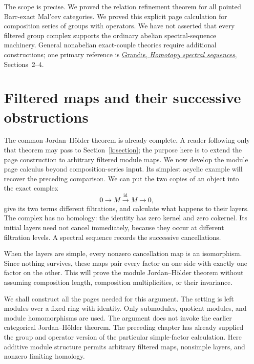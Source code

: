 \documentclass[11pt]{article}
\theoremstyle{definition}
\theoremstyle{remark}\newtheorem{remark}[theorem]{Remark}
\newcommand{\id}{\mathrm{id}}
\begin{document}
The scope is precise. We proved the relation refinement theorem for all
pointed Barr-exact Mal'cev categories. We proved this explicit page
calculation for composition series of groups with operators. We have not
asserted that every filtered group complex supports the ordinary abelian
spectral-sequence machinery. General nonabelian exact-couple theories
require additional constructions; one primary reference is
\href{https://arxiv.org/pdf/1007.0632}{Grandis, \emph{Homotopy spectral
sequences}}, Sections~2--4.



\section{Filtered maps and their successive obstructions}\label{s:chapter}

The common Jordan--H\"older theorem is already complete. A reader following
only that theorem may pass to Section~\ref{k:section}; the purpose here
is to extend the page construction to arbitrary filtered module maps.
We now develop the module page calculus beyond composition-series input.
Its simplest acyclic example will recover the preceding comparison.
We can put the two copies of an object into the exact complex
\[
0\longrightarrow M\xrightarrow{\id}M\longrightarrow0,
\]
give its two terms different filtrations, and calculate what happens to
their layers. The complex has no homology: the identity has zero kernel
and zero cokernel. Its initial layers need not cancel immediately,
because they occur at different filtration levels. A spectral sequence
records the successive cancellations.

When the layers are simple, every nonzero cancellation map is an
isomorphism. Since nothing survives, these maps pair every factor on one
side with exactly one factor on the other. This will prove the module
Jordan--H\"older theorem without assuming composition length, composition
multiplicities, or their invariance.

We shall construct all the pages needed for this argument. The setting is
left modules over a fixed ring with identity. Only submodules, quotient
modules, and module homomorphisms are used. The argument does not invoke
the earlier categorical Jordan--H\"older theorem. The preceding chapter
has already supplied the group and operator version of the particular
simple-factor calculation. Here additive module structure permits
arbitrary filtered maps, nonsimple layers, and nonzero limiting homology.
\end{document}
